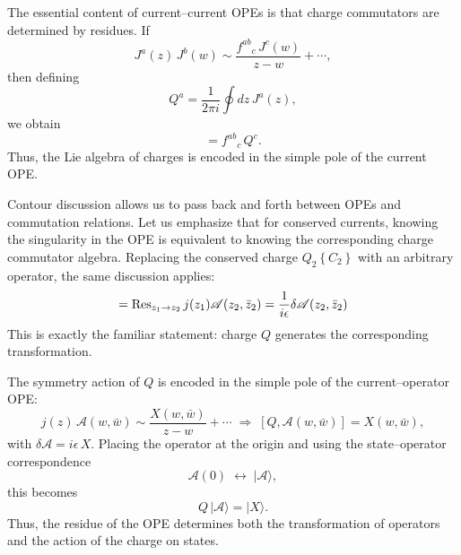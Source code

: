 \begin{tcolorbox}[breakable]
	\begin{remark}
		The essential content of current--current OPEs is that charge commutators are determined by residues. If
		\begin{equation}
			J^a(z)\,J^b(w) \sim \frac{f^{ab}{}_c\, J^c(w)}{z-w} + \cdots,
		\end{equation}
		then defining
		\begin{equation}
			Q^a = \frac{1}{2\pi i}\oint dz\, J^a(z),
		\end{equation}
		we obtain
		\begin{equation}
			[Q^a, Q^b] = f^{ab}{}_c\, Q^c.
		\end{equation}
		Thus, the Lie algebra of charges is encoded in the simple pole of the current OPE.
	\end{remark}
\end{tcolorbox}
Contour discussion allows us to pass back and forth between OPEs and commutation relations.    
Let us emphasize that for conserved currents, knowing the singularity in the OPE is equivalent to knowing the corresponding charge commutator algebra. Replacing the conserved charge $Q_{2}\left\{C_{2}\right\}$ with an arbitrary operator, the same discussion applies:    
\begin{equation}
	[Q, \mathscr{A}(z_{2}, \bar{z}_{2})]=\operatorname{Res}_{z_{1} \to z_{2}} j(z_{1}) \mathscr{A}(z_{2}, \bar{z}_{2})
	=\frac{1}{\mi \epsilon} \delta \mathscr{A}(z_{2}, \bar{z}_{2}) \label{2.6.15}
\end{equation}
This is exactly the familiar statement: charge $Q$ generates the corresponding transformation. 
\begin{tcolorbox}[breakable]
\begin{remark}
	The symmetry action of $Q$ is encoded in the simple pole of the current--operator OPE:
	\begin{equation}
		j(z)\,\mathscr A(w,\bar w)
		\sim \frac{X(w,\bar w)}{z-w} + \cdots
		\;\Longrightarrow\;
		[Q,\mathscr A(w,\bar w)] = X(w,\bar w),
	\end{equation}
	with $\delta \mathscr A = i\epsilon\, X$. Placing the operator at the origin and using the state--operator correspondence
	\begin{equation}
		\mathscr A(0)\;\leftrightarrow\;|\mathscr A\rangle,
	\end{equation}
	this becomes
	\begin{equation}
		Q\,|\mathscr A\rangle = |X\rangle.
	\end{equation}
	Thus, the residue of the OPE determines both the transformation of operators and the action of the charge on states.
\end{remark}
\end{tcolorbox}   
